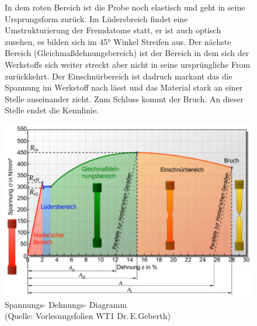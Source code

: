 \documentclass[12pt]{scrreprt}
\begin{document}
\begin{figure}[h]
    \begin{minipage}{0.4\textwidth} 
        In dem roten Bereich ist die Probe noch elastisch und geht in seine Ursprungsform zurück.
        Im Lüdersbreich findet eine Umstrukturierung der Fremdatome statt, er ist auch optisch zusehen, es bilden sich im 45° Winkel Streifen aus. 
        Der nächste Bereich (Gleichmaßdehnungsbereich) ist der Bereich in dem sich der Werkstoffs sich weiter streckt aber nicht in seine ursprüngliche From zurückkehrt.
        Der Einschnürbereich ist dadruch markant das die Spannung im Werkstoff nach lässt und das Material stark an einer Stelle auseinander zieht.
        Zum Schluss kommt der Bruch. An dieser Stelle endet die Kennlinie. 
	\end{minipage}
	\hfill
	\begin{minipage}{0.55\textwidth}
	\includegraphics[width=\textwidth]{spannungsdiagramm.png}
	\caption{Spannungs- Dehnungs- Diagramm \\(Quelle: Vorlesungsfolien WT1 Dr.\,E.Geberth)}
	\end{minipage}
\end{figure}
\end{document}
